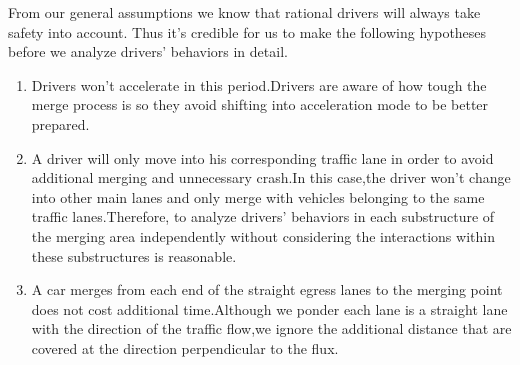 From our general assumptions we know that rational drivers will always take safety into account. Thus it's credible for us to make the following hypotheses before we analyze drivers' behaviors in detail.
\begin{enumerate}[(1)]
	\item
	Drivers won't accelerate in this period.Drivers are aware of how tough the merge process is so they avoid shifting into acceleration mode to be better prepared.
	\item
	A driver will only move into his corresponding traffic lane in order to avoid additional merging and unnecessary crash.In this case,the driver won't change into other main lanes and only merge with vehicles belonging to the same traffic lanes.Therefore, to analyze drivers' behaviors in each substructure of the merging area independently without considering the interactions within these substructures is reasonable.
	\item
	A car merges from each end of the straight egress lanes to the merging point does not cost additional time.Although we ponder each lane is a straight lane with the direction of the traffic flow,we ignore the additional distance that are covered at the direction perpendicular to the flux.
\end{enumerate}


